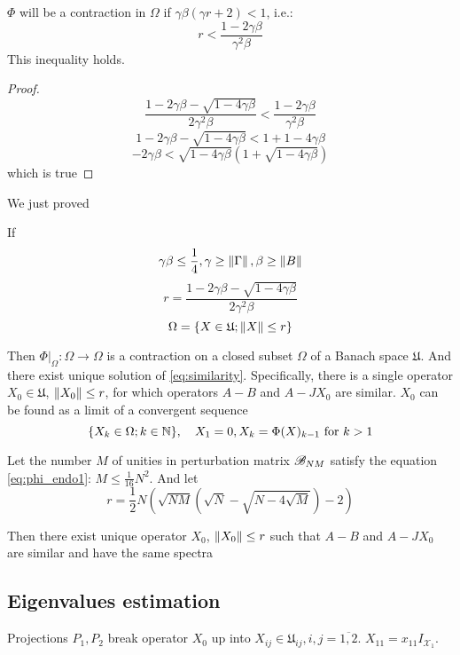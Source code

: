 \documentclass{article}
\begin{document}
\( \Phi \) will be a contraction in \( \Omega \) if \( \gamma\beta(\gamma r + 2) < 1 \), i.e.:
\[r < \frac{1-2\gamma\beta}{\gamma^2\beta}\]
This inequality holds.
\begin{TRIVIA}
    \begin{proof}
        \[\frac{1-2\gamma\beta-\sqrt{1-4\gamma\beta}}{2\gamma^2\beta} < \frac{1-2\gamma\beta}{\gamma^2\beta}\]
        \[1-2\gamma\beta-\sqrt{1-4\gamma\beta} < 1+1-4\gamma\beta\]
        \[-2\gamma\beta<\sqrt{1-4\gamma\beta}\left(1+\sqrt{1-4\gamma\beta}\right)\]
        which is true
    \end{proof}
\end{TRIVIA}

We just proved
\begin{thm}
    If
    \[\gamma\beta\leq\frac14, \gamma\geq\left\|{\Gamma}\right\|, \beta\geq\left\|{B}\right\|\]
    \[r = \frac{1 - 2\gamma\beta - \sqrt{1-4\gamma\beta}}{2 \gamma^2 \beta}\]
    \[\Omega = \{ X\in\mathfrak U; \left\|{X}\right\| \leq r \}\]

    Then
    \( \Phi|_{\Omega}:\Omega\to\Omega \) is a contraction on a closed subset \( \Omega \) of a Banach space \( \mathfrak U \).
    And there exist unique solution of \eqref{eq:similarity}.
    Specifically, there is a single operator \( X_0\in\mathfrak U \), \( \left\|{X_0}\right\| \leq r \),
    for which operators \( A-B \) and \( A-JX_0 \) are similar.
    \( X_0 \) can be found as a limit of a convergent sequence
    \[\{X_k\in\Omega; k\in\mathbb{N}\}, \quad X_1 = 0, X_k = \Phi(X)_{k-1} \text{ for } k>1\]
\end{thm}

\begin{corollary}
    Let the number \( M \) of unities in perturbation matrix \( \mathscr{B}_{{N}{M}} \)
    satisfy the equation \eqref{eq:phi_endo1}: \( M \leq \frac{1}{16} N^2 \).
    And let
    \[ r = \frac12 N
        \left(
        \sqrt{NM}(\sqrt{N} - \sqrt{N-4\sqrt{M}}) - 2
        \right) \]

    Then there exist unique operator \( X_0 \), \( \left\|{X_0}\right\| \leq r \) such that \( A - B \) and \( A - J X_0 \) are similar
    and have the same spectra
\end{corollary}

\subsection{Eigenvalues estimation}
Projections \( P_1, P_2 \) break operator \( X_0 \) up into \( X_{ij}\in\mathfrak U_{ij}, i,j=\overline{1,2} \).
\( X_{11} = x_{11} I_{\mathcal X_1} \).
\end{document}
